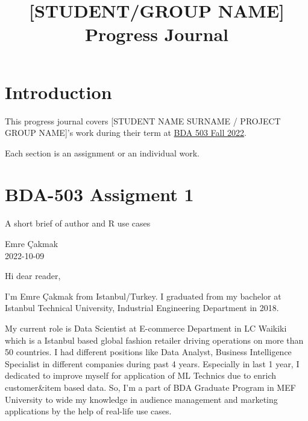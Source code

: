 \documentclass[
  letterpaper,
  DIV=11,
  numbers=noendperiod]{scrreprt}
\title{{[}STUDENT/GROUP NAME{]} Progress Journal}
\author{}
\date{}
\renewcommand*\contentsname{Table of contents}
\newcommand\contentsname{Table of contents}
\begin{document}
\maketitle
\ifdefined\Shaded\renewenvironment{Shaded}{\begin{tcolorbox}[interior hidden, boxrule=0pt, frame hidden, enhanced, breakable, sharp corners, borderline west={3pt}{0pt}{shadecolor}]}{\end{tcolorbox}}\fi

\renewcommand*\contentsname{Table of contents}
{
\hypersetup{linkcolor=}
\setcounter{tocdepth}{2}
\tableofcontents
}

\hypertarget{introduction}{%
\chapter*{Introduction}\label{introduction}}

This progress journal covers {[}STUDENT NAME SURNAME / PROJECT GROUP
NAME{]}'s work during their term at
\href{https://mef-bda503.github.io/fall22/}{BDA 503 Fall 2022}.

Each section is an assignment or an individual work.


\hypertarget{bda-503-assigment-1}{%
\chapter{BDA-503 Assigment 1}\label{bda-503-assigment-1}}

A short brief of author and R use cases

Emre Çakmak\\
2022-10-09

\hfill\break

Hi dear reader,

I'm Emre Çakmak from Istanbul/Turkey. I graduated from my bachelor at
Istanbul Technical University, Industrial Engineering Department in
2018.

My current role is Data Scientist at E-commerce Department in LC Waikiki
which is a Istanbul based global fashion retailer driving operations on
more than 50 countries. I had different positions like Data Analyst,
Business Intelligence Specialist in different companies during past 4
years. Especially in last 1 year, I dedicated to improve myself for
application of ML Technics due to enrich customer\&item based data. So,
I'm a part of BDA Graduate Program in MEF University to wide my
knowledge in audience management and marketing applications by the help
of real-life use cases.
\end{document}
